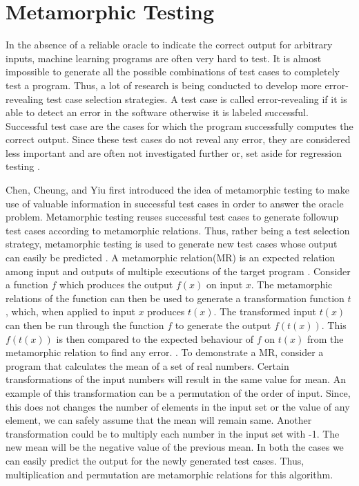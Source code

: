 \section{Metamorphic Testing}

In the absence of a reliable oracle to indicate the correct output for arbitrary inputs, machine learning programs are often very hard to test. It is almost impossible to generate all the possible combinations of test cases to completely test a program. Thus, a lot of research is being conducted to develop more error-revealing test case selection strategies. A test case is called error-revealing if it is able to detect an error in the software otherwise it is labeled successful. Successful test case are the cases for which the program successfully computes the correct output. Since these test cases do not reveal any error, they are considered less important and are often not investigated further or, set aside for regression testing \cite{Zhou2004, Chen2003}.

Chen, Cheung, and Yiu \cite{Chen1998} first introduced the idea of metamorphic testing to make use of valuable information in successful test cases in order to answer the oracle problem. Metamorphic testing reuses successful test cases to generate followup test cases according to metamorphic relations. Thus, rather being a test selection strategy, metamorphic testing is used to generate new test cases whose output can easily be predicted \cite{Murphy2008}. A metamorphic relation(MR) is an expected relation among input and outputs of multiple executions of the target program \cite{Chen2003,Zhou2016}. Consider a function $f$ which produces the output $f(x)$ on input $x$. The metamorphic relations of the function can then be used to generate a transformation function $t$, which, when applied to input $x$ produces $t(x)$. The transformed input $t(x)$ can then be run through the function $f$ to generate the output $f(t(x))$. This $f(t(x))$ is then compared to the expected behaviour of $f$ on $t(x)$ from the metamorphic relation to find any error. \cite{Murphy2009}. 
To demonstrate a MR, consider a program that calculates the mean of a set of real numbers. Certain transformations of the input numbers will result in the same value for mean. An example of this transformation can be a permutation of the order of input. Since, this does not changes the number of elements in the input set or the value of any element, we can safely assume that the mean will remain same. Another transformation could be to multiply each number in the input set with -1. The new mean will be the negative value of the previous mean. In both the cases we can easily predict the output for the newly generated test cases. Thus, multiplication and permutation are metamorphic relations for this algorithm.

